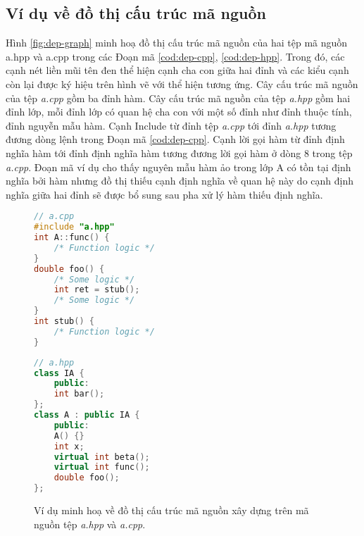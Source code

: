 \subsection*{Ví dụ về đồ thị cấu trúc mã nguồn}
Hình \autoref{fig:dep-graph} minh hoạ đồ thị cấu trúc mã nguồn của hai tệp mã nguồn a.hpp và a.cpp trong các Đoạn mã \autoref{cod:dep-cpp}, \autoref{cod:dep-hpp}. Trong đó, các cạnh nét liền mũi tên đen thể hiện cạnh cha con giữa hai đỉnh và các kiểu cạnh còn lại được ký hiệu trên hình vẽ với thể hiện tương ứng. Cây cấu trúc mã nguồn của tệp \textit{a.cpp} gồm ba đỉnh hàm. Cây cấu trúc mã nguồn của tệp \textit{a.hpp} gồm hai đỉnh lớp, mỗi đỉnh lớp có quan hệ cha con với một số đỉnh như đỉnh thuộc tính, đỉnh nguyễn mẫu hàm. Cạnh Include từ đỉnh tệp \textit{a.cpp} tới đỉnh \textit{a.hpp} tương đương dòng lệnh  trong Đoạn mã \autoref{cod:dep-cpp}. Cạnh lời gọi hàm từ đỉnh định nghĩa hàm  tới đỉnh định nghĩa hàm  tương đương lời gọi hàm ở dòng 8 trong tệp \textit{a.cpp}. Đoạn mã ví dụ cho thấy nguyên mẫu hàm ảo  trong lớp A có tồn tại định nghĩa bởi hàm  nhưng đồ thị thiếu cạnh định nghĩa về quan hệ này do cạnh định nghĩa giữa hai đỉnh sẽ được bổ sung sau pha xử lý hàm thiếu định nghĩa.  

\begin{figure}[H]
	\begin{minipage}[t]{0.49\linewidth}
		\begin{lstlisting}[language=C++, caption={Mã nguồn tệp \textit{a.cpp} minh họa đồ thị cấu trúc mã nguồn.}, label={cod:dep-cpp}, captionpos=b]
// a.cpp
#include "a.hpp"
int A::func() {
	/* Function logic */
}
double foo() {
	/* Some logic */
	int ret = stub();
	/* Some logic */
}
int stub() {
	/* Function logic */
}
		\end{lstlisting}
	\end{minipage}
	\begin{minipage}[t]{0.49\linewidth}
		\begin{lstlisting}[language=C++, caption={Mã nguồn tệp \textit{a.hpp} minh họa đồ thị cấu trúc mã nguồn.}, label={cod:dep-hpp}, captionpos=b]
// a.hpp
class IA {
	public: 
	int bar();
};
class A : public IA {
	public:
	A() {}
	int x;
	virtual int beta();
	virtual int func();
	double foo();
}; 
		\end{lstlisting}
	\end{minipage}
			
	\vspace{1cm}
    
    \caption{Ví dụ minh hoạ về đồ thị cấu trúc mã nguồn xây dựng trên mã nguồn tệp \textit{a.hpp} và \textit{a.cpp}.}
    \label{fig:dep-graph}
\end{figure}

